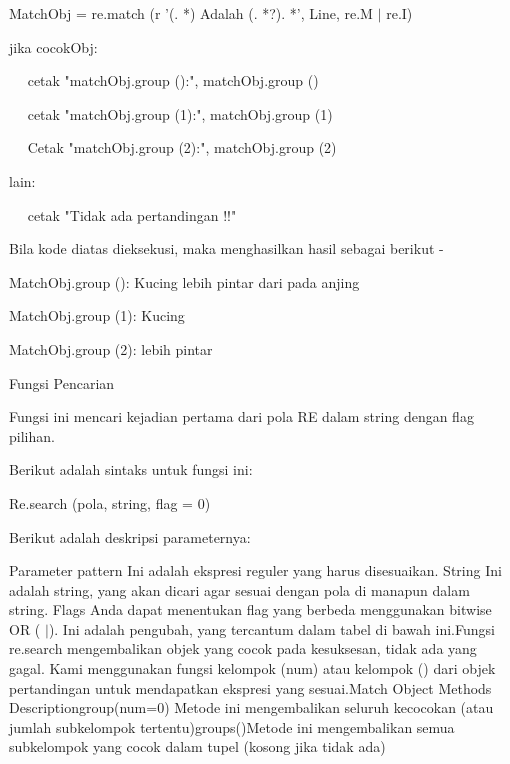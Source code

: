 \begin {enumerate}
MatchObj = re.match (r '(. *) Adalah (. *?). *', Line, re.M  $  \vert  $ re.I) \par
\vspace{12pt}
\noindent 
jika cocokObj: \par
\noindent 
~~ cetak "matchObj.group ():", matchObj.group () \par
\noindent 
~~ cetak "matchObj.group (1):", matchObj.group (1) \par
\noindent 
~~ Cetak "matchObj.group (2):", matchObj.group (2) \par
\noindent 
lain: \par
\noindent 
~~ cetak "Tidak ada pertandingan !!" \par
\vspace{12pt}
\noindent 
Bila kode diatas dieksekusi, maka menghasilkan hasil sebagai berikut - \par
\vspace{12pt}
\noindent 
MatchObj.group (): Kucing lebih pintar dari pada anjing \par
\noindent 
MatchObj.group (1): Kucing \par
\noindent 
MatchObj.group (2): lebih pintar \par
\vspace{12pt}
Fungsi Pencarian \par
\vspace{12pt}
Fungsi ini mencari kejadian pertama dari pola RE dalam string dengan flag pilihan. \par
\vspace{12pt}
Berikut adalah sintaks untuk fungsi ini: \par
\vspace{12pt}
Re.search (pola, string, flag = 0) \par
\vspace{12pt}
\noindent 
Berikut adalah deskripsi parameternya: \par
Parameter pattern Ini adalah ekspresi reguler yang harus disesuaikan. String Ini adalah string, yang akan dicari agar sesuai dengan pola di manapun dalam string. Flags Anda dapat menentukan flag yang berbeda menggunakan bitwise OR ( $  \vert  $). Ini adalah pengubah, yang tercantum dalam tabel di bawah ini.Fungsi re.search mengembalikan objek yang cocok pada kesuksesan, tidak ada yang gagal. Kami menggunakan fungsi kelompok (num) atau kelompok () dari objek pertandingan untuk mendapatkan ekspresi yang sesuai.Match Object Methods Descriptiongroup(num=0) Metode ini mengembalikan seluruh kecocokan (atau jumlah subkelompok tertentu)groups()Metode ini mengembalikan semua subkelompok yang cocok dalam tupel (kosong jika tidak ada) \par

\end{enumerate}
